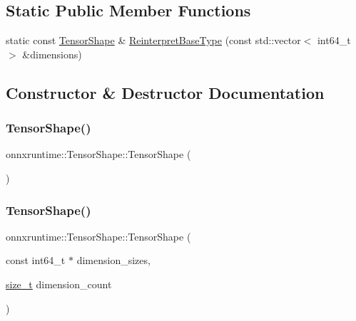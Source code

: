 \subsection*{Static Public Member Functions}
\begin{DoxyCompactItemize}
\item 
static const \mbox{\hyperlink{classonnxruntime_1_1TensorShape}{Tensor\+Shape}} \& \mbox{\hyperlink{classonnxruntime_1_1TensorShape_ac7df37b3db58eb9e1847986b89fd2c6f}{Reinterpret\+Base\+Type}} (const std\+::vector$<$ int64\+\_\+t $>$ \&dimensions)
\end{DoxyCompactItemize}


\subsection{Constructor \& Destructor Documentation}
\mbox{\label{classonnxruntime_1_1TensorShape_a6ef240d824ddcd9e45c720fe70b84d3c}} 
\subsubsection{\texorpdfstring{Tensor\+Shape()}{TensorShape()}\hspace{0.1cm}{\footnotesize\ttfamily [1/6]}}
{\footnotesize\ttfamily onnxruntime\+::\+Tensor\+Shape\+::\+Tensor\+Shape (\begin{DoxyParamCaption}{ }\end{DoxyParamCaption})\hspace{0.3cm}{\ttfamily [default]}}

\mbox{\label{classonnxruntime_1_1TensorShape_a0e4795044253526b2c86a00d2d123c16}} 
\subsubsection{\texorpdfstring{Tensor\+Shape()}{TensorShape()}\hspace{0.1cm}{\footnotesize\ttfamily [2/6]}}
{\footnotesize\ttfamily onnxruntime\+::\+Tensor\+Shape\+::\+Tensor\+Shape (\begin{DoxyParamCaption}\item[{const int64\+\_\+t $\ast$}]{dimension\+\_\+sizes,  }\item[{\mbox{\hyperlink{mlasi_8h_a503efbc1c6e50825320ad909366b78ab}{size\+\_\+t}}}]{dimension\+\_\+count }\end{DoxyParamCaption})}

